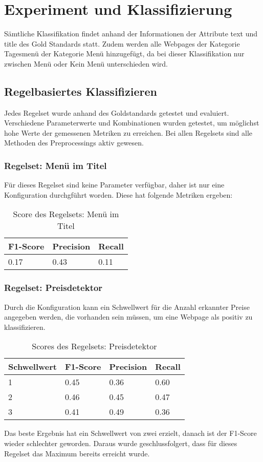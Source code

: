 \chapter{Experiment und Klassifizierung}
\label{cap:exp_class}
Sämtliche Klassifikation findet anhand der Informationen der Attribute \glqq text\grqq{} und \glqq title\grqq{} des Gold Standards statt.
Zudem werden alle Webpages der Kategorie \glqq Tagesmenü\grqq{} der Kategorie \glqq Menü\grqq{} hinzugefügt, da bei dieser Klassifikation nur zwischen \glqq Menü\grqq{} oder \glqq Kein Menü\grqq{} unterschieden wird.
\section{Regelbasiertes Klassifizieren}
Jedes Regelset wurde anhand des Goldstandards getestet und evaluiert.
Verschiedene Parameterwerte und Kombinationen wurden getestet, um möglichst hohe Werte der gemessenen Metriken zu erreichen.
Bei allen Regelsets sind alle Methoden des Preprocessings aktiv gewesen. 
\subsection{Regelset: Menü im Titel}
Für dieses Regelset sind keine Parameter verfügbar, daher ist nur eine Konfiguration durchgführt worden.
Diese hat folgende Metriken ergeben:\\
\begin{table}[H]
\caption{Score des Regelsets: Menü im Titel}
\centering
\begin{tabular}{|l|l|l|}
	\hline
	F1-Score & Precision & Recall\\
	\hline
	0.17 & 0.43 & 0.11  \\
	\hline
\end{tabular}
\end{table}
\subsection{Regelset: Preisdetektor}
Durch die Konfiguration kann ein Schwellwert für die Anzahl erkannter Preise angegeben werden, die vorhanden sein müssen, um eine Webpage als positiv zu klassifizieren.\\
\begin{table}[H]
\caption{Scores des Regelsets: Preisdetektor}
\centering
\begin{tabular}{|l|l|l|l|}
	\hline
	Schwellwert & F1-Score & Precision & Recall\\
	\hline
	1 & 0.45 & 0.36 & 0.60  \\
	2 & 0.46 & 0.45 & 0.47 \\
	3 & 0.41 & 0.49 & 0.36 \\
	\hline
\end{tabular}
\end{table}
Das beste Ergebnis hat ein Schwellwert von zwei erzielt, danach ist der F1-Score wieder schlechter geworden.
Daraus wurde geschlussfolgert, dass für dieses Regelset das Maximum bereits erreicht wurde.
